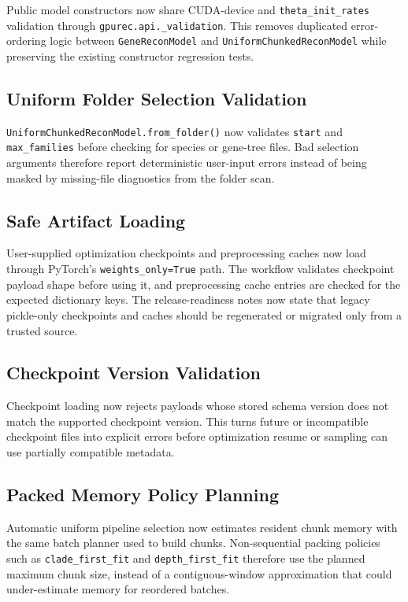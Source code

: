 \documentclass[11pt]{article}
\begin{document}
Public model constructors now share CUDA-device and
\texttt{theta\_init\_rates} validation through \texttt{gpurec.api.\_validation}.
This removes duplicated error-ordering logic between \texttt{GeneReconModel}
and \texttt{UniformChunkedReconModel} while preserving the existing constructor
regression tests.

\subsection{Uniform Folder Selection Validation}

\texttt{UniformChunkedReconModel.from\_folder()} now validates \texttt{start}
and \texttt{max\_families} before checking for species or gene-tree files.  Bad
selection arguments therefore report deterministic user-input errors instead of
being masked by missing-file diagnostics from the folder scan.

\subsection{Safe Artifact Loading}

User-supplied optimization checkpoints and preprocessing caches now load through
PyTorch's \texttt{weights\_only=True} path.  The workflow validates checkpoint
payload shape before using it, and preprocessing cache entries are checked for
the expected dictionary keys.  The release-readiness notes now state that legacy
pickle-only checkpoints and caches should be regenerated or migrated only from a
trusted source.

\subsection{Checkpoint Version Validation}

Checkpoint loading now rejects payloads whose stored schema version does not
match the supported checkpoint version.  This turns future or incompatible
checkpoint files into explicit errors before optimization resume or sampling can
use partially compatible metadata.

\subsection{Packed Memory Policy Planning}

Automatic uniform pipeline selection now estimates resident chunk memory with
the same batch planner used to build chunks.  Non-sequential packing policies
such as \texttt{clade\_first\_fit} and \texttt{depth\_first\_fit} therefore use
the planned maximum chunk size, instead of a contiguous-window approximation
that could under-estimate memory for reordered batches.
\end{document}
